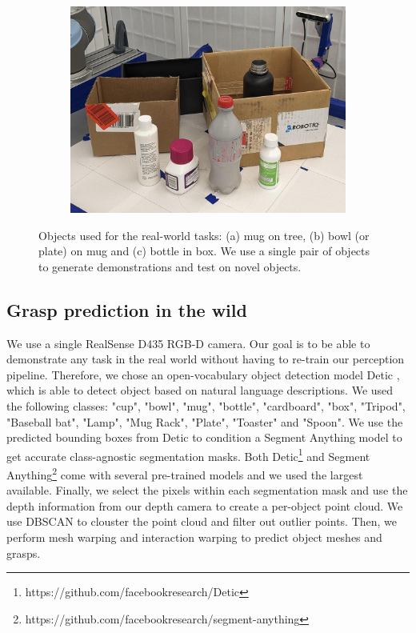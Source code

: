 \documentclass{article}
\begin{document}
\begin{figure}[]
\begin{subfigure}{(\linewidth - 0.05\linewidth)/3}
        \centering
        \includegraphics[width=\linewidth]{figures/object_sets/bottle_in_box.jpg}
        \caption{}
    \end{subfigure}

    \caption{Objects used for the real-world tasks: (a) mug on tree, (b) bowl (or plate) on mug and (c) bottle in box. We use a single pair of objects to generate demonstrations and test on novel objects.}
    \label{fig:object_sets}
\end{figure}

\subsection{Grasp prediction in the wild}
\label{appendix:experiment:wild}

We use a single RealSense D435 RGB-D camera. Our goal is to be able to demonstrate any task in the real world without having to re-train our perception pipeline. Therefore, we chose an open-vocabulary object detection model Detic \cite{zhou22detecting}, which is able to detect object based on natural language descriptions. We used the following classes: "cup", "bowl", "mug", "bottle", "cardboard", "box", "Tripod", "Baseball bat", "Lamp", "Mug Rack", "Plate", "Toaster" and "Spoon". We use the predicted bounding boxes from Detic to condition a Segment Anything model \cite{kirillov23segment} to get accurate class-agnostic segmentation masks. Both Detic\footnote{https://github.com/facebookresearch/Detic} and Segment Anything\footnote{https://github.com/facebookresearch/segment-anything} come with several pre-trained models and we used the largest available. Finally, we select the pixels within each segmentation mask and use the depth information from our depth camera to create a per-object point cloud. We use DBSCAN to clouster the point cloud and filter out outlier points. Then, we perform mesh warping and interaction warping to predict object meshes and grasps.
\end{document}
